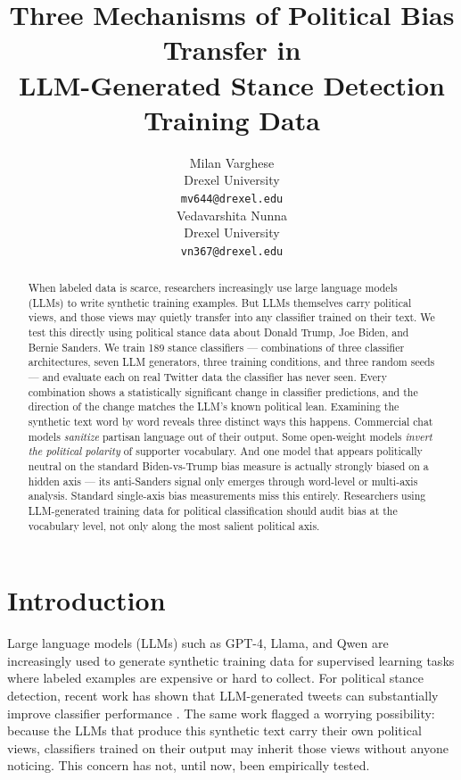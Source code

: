 \documentclass[11pt]{article}
\title{Three Mechanisms of Political Bias Transfer in \\ LLM-Generated Stance Detection Training Data}
\author{Milan Varghese \\
  Drexel University \\
  \texttt{mv644@drexel.edu} \\\And
  Vedavarshita Nunna \\
  Drexel University \\
  \texttt{vn367@drexel.edu} \\}
\begin{document}
\maketitle

\begin{abstract}
When labeled data is scarce, researchers increasingly use large language models (LLMs) to write synthetic training examples. But LLMs themselves carry political views, and those views may quietly transfer into any classifier trained on their text. We test this directly using political stance data about Donald Trump, Joe Biden, and Bernie Sanders. We train 189 stance classifiers --- combinations of three classifier architectures, seven LLM generators, three training conditions, and three random seeds --- and evaluate each on real Twitter data the classifier has never seen. Every combination shows a statistically significant change in classifier predictions, and the direction of the change matches the LLM's known political lean. Examining the synthetic text word by word reveals three distinct ways this happens. Commercial chat models \emph{sanitize} partisan language out of their output. Some open-weight models \emph{invert the political polarity} of supporter vocabulary. And one model that appears politically neutral on the standard Biden-vs-Trump bias measure is actually strongly biased on a hidden axis --- its anti-Sanders signal only emerges through word-level or multi-axis analysis. Standard single-axis bias measurements miss this entirely. Researchers using LLM-generated training data for political classification should audit bias at the vocabulary level, not only along the most salient political axis.
\end{abstract}

\section{Introduction}

Large language models (LLMs) such as GPT-4, Llama, and Qwen are increasingly used to generate synthetic training data for supervised learning tasks where labeled examples are expensive or hard to collect. For political stance detection, recent work has shown that LLM-generated tweets can substantially improve classifier performance \citep{wagner2024synth}. The same work flagged a worrying possibility: because the LLMs that produce this synthetic text carry their own political views, classifiers trained on their output may inherit those views without anyone noticing. This concern has not, until now, been empirically tested.
\end{document}
